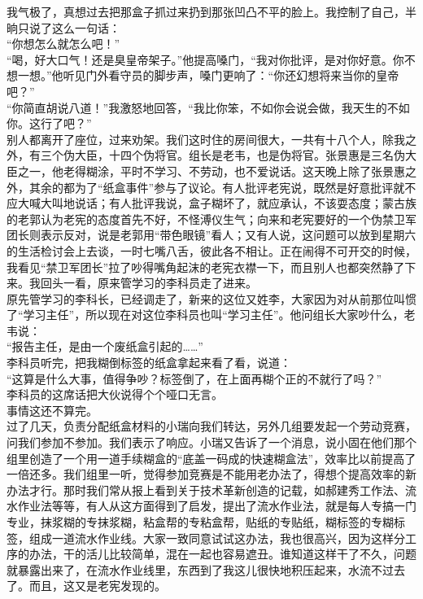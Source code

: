 我气极了，真想过去把那盒子抓过来扔到那张凹凸不平的脸上。我控制了自己，半晌只说了这么一句话：\\

“你想怎么就怎么吧！”\\

“喝，好大口气！还是臭皇帝架子。”他提高嗓门，“我对你批评，是对你好意。你不想一想。”他听见门外看守员的脚步声，嗓门更响了：“你还幻想将来当你的皇帝吧？”\\

“你简直胡说八道！”我激怒地回答，“我比你笨，不如你会说会做，我天生的不如你。这行了吧？”\\

别人都离开了座位，过来劝架。我们这时住的房间很大，一共有十八个人，除我之外，有三个伪大臣，十四个伪将官。组长是老韦，也是伪将官。张景惠是三名伪大臣之一，他老得糊涂，平时不学习、不劳动，也不爱说话。这天晚上除了张景惠之外，其余的都为了“纸盒事件”参与了议论。有人批评老宪说，既然是好意批评就不应大喊大叫地说话；有人批评我说，盒子糊坏了，就应承认，不该耍态度；蒙古族的老郭认为老宪的态度首先不好，不怪溥仪生气；向来和老宪要好的一个伪禁卫军团长则表示反对，说是老郭用“带色眼镜”看人；又有人说，这问题可以放到星期六的生活检讨会上去谈，一时七嘴八舌，彼此各不相让。正在闹得不可开交的时候，我看见“禁卫军团长”拉了吵得嘴角起沫的老宪衣襟一下，而且别人也都突然静了下来。我回头一看，原来管学习的李科员走了进来。\\

原先管学习的李科长，已经调走了，新来的这位又姓李，大家因为对从前那位叫惯了“学习主任”，所以现在对这位李科员也叫“学习主任”。他问组长大家吵什么，老韦说：\\

“报告主任，是由一个废纸盒引起的……”\\

李科员听完，把我糊倒标签的纸盒拿起来看了看，说道：\\

“这算是什么大事，值得争吵？标签倒了，在上面再糊个正的不就行了吗？”\\

李科员的这席话把大伙说得个个哑口无言。\\

事情这还不算完。\\

过了几天，负责分配纸盒材料的小瑞向我们转达，另外几组要发起一个劳动竞赛，问我们参加不参加。我们表示了响应。小瑞又告诉了一个消息，说小固在他们那个组里创造了一个用一道手续糊盒的“底盖一码成的快速糊盒法”，效率比以前提高了一倍还多。我们组里一听，觉得参加竞赛是不能用老办法了，得想个提高效率的新办法才行。那时我们常从报上看到关于技术革新创造的记载，如郝建秀工作法、流水作业法等等，有人从这方面得到了启发，提出了流水作业法，就是每人专搞一门专业，抹浆糊的专抹浆糊，粘盒帮的专粘盒帮，贴纸的专贴纸，糊标签的专糊标签，组成一道流水作业线。大家一致同意试试这办法，我也很高兴，因为这样分工序的办法，干的活儿比较简单，混在一起也容易遮丑。谁知道这样干了不久，问题就暴露出来了，在流水作业线里，东西到了我这儿很快地积压起来，水流不过去了。而且，这又是老宪发现的。\\

